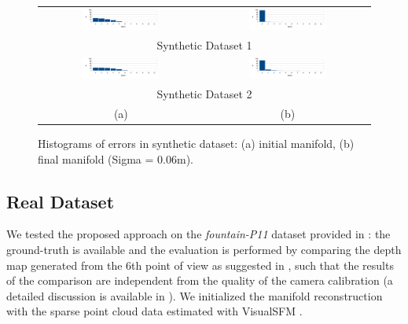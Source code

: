 \begin{figure}[t]
\setlength{\tabcolsep}{1px}
\centering
\begin{tabular}{cc}
\includegraphics[width=0.49\textwidth]{./img/synth1InitHist}&
\includegraphics[width=0.49\textwidth]{./img/synth1ResHist}\\
\multicolumn{2}{c}{Synthetic Dataset 1}\\
\includegraphics[width=0.49\textwidth]{./img/synth2InitHist}&
\includegraphics[width=0.49\textwidth]{./img/synth2ResHist}\\
\multicolumn{2}{c}{Synthetic Dataset 2}\\
(a) &
(b) \\
\end{tabular}
\caption{Histograms of errors in synthetic dataset: (a) initial manifold, (b) final manifold (Sigma = 0.06m).}
\label{fig:simulatedhist}
\end{figure}


\subsection{Real Dataset}
We tested the proposed approach on the \emph{fountain-P11} dataset provided in \cite{strecha2008}: the ground-truth is available and the evaluation is performed by comparing the depth map generated from the 6th point of view as suggested in  \cite{strecha2008}, such that the results of the comparison are independent from the quality of the camera calibration (a detailed discussion is available in \cite{strecha2008}). We initialized the manifold reconstruction with the sparse point cloud data estimated with VisualSFM \cite{wu2011visualsfm}. 


